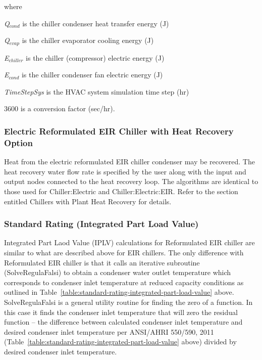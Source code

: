 where

\emph{Q\(_{cond}\)} is the chiller condenser heat transfer energy (J)

\emph{Q\(_{evap}\)} is the chiller evaporator cooling energy (J)

\emph{E\(_{chiller}\)} is the chiller (compressor) electric energy (J)

\emph{E\(_{cond}\)} is the chiller condenser fan electric energy (J)

\emph{TimeStepSys} is the HVAC system simulation time step (hr)

\(3600\) is a conversion factor (sec/hr).

\subsubsection{Electric Reformulated EIR Chiller with Heat Recovery Option}\label{electric-reformulated-eir-chiller-with-heat-recovery-option}

Heat from the electric reformulated EIR chiller condenser may be recovered. The heat recovery water flow rate is specified by the user along with the input and output nodes connected to the heat recovery loop. The algorithms are identical to those used for Chiller:Electric and Chiller:Electric:EIR. Refer to the section entitled Chillers with Plant Heat Recovery for details.

\subsubsection{Standard Rating (Integrated Part Load Value)}\label{standard-rating-integrated-part-load-value-1}

Integrated Part Laod Value (IPLV) calculations for Reformulated EIR chiller are similar to what are described above for EIR chillers. The only difference with Reformulated EIR chiller is that it calls an iterative subroutine (SolveRegulaFalsi) to obtain a condenser water outlet temperature which corresponds to condenser inlet temperature at reduced capacity conditions as outlined in Table~\ref{table:standard-rating-integrated-part-load-value} above. SolveRegulaFalsi is a general utility routine for finding the zero of a function. In this case it finds the condenser inlet temperature that will zero the residual function -- the difference between calculated condenser inlet temperature and desired condenser inlet temperature per ANSI/AHRI 550/590, 2011 (Table~\ref{table:standard-rating-integrated-part-load-value} above) divided by desired condenser inlet temperature.

